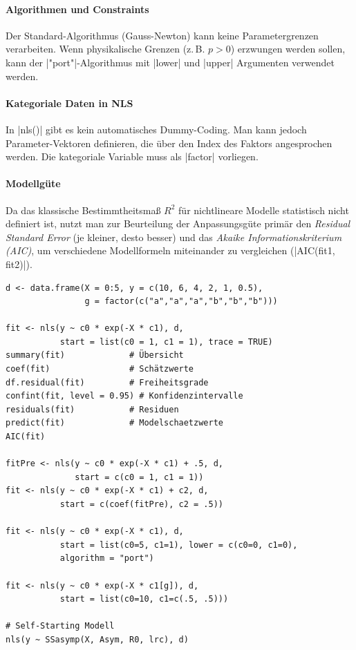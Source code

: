 \documentclass[10pt,twocolumn]{scrartcl}
\renewcommand{\lstinline}{\mycoloredinline}
\begin{document}
\paragraph{Algorithmen und Constraints}
Der Standard-Algorithmus (Gauss-Newton) kann keine Parametergrenzen verarbeiten. Wenn physikalische Grenzen (z.\,B. $p > 0$) erzwungen werden sollen, kann der \lstinline|"port"|-Algorithmus mit \lstinline|lower| und \lstinline|upper| Argumenten verwendet werden.

\paragraph{Kategoriale Daten in NLS}
In \lstinline|nls()| gibt es kein automatisches Dummy-Coding. Man kann jedoch Parameter-Vektoren definieren, die über den Index des Faktors angesprochen werden. Die kategoriale Variable muss als \lstinline|factor| vorliegen.

\paragraph{Modellgüte}
Da das klassische Bestimmtheitsmaß $R^2$ für nichtlineare Modelle statistisch nicht definiert ist, nutzt man zur Beurteilung der Anpassungsgüte primär den \emph{Residual Standard Error} (je kleiner, desto besser) und das \emph{Akaike Informationskriterium (AIC)}, um verschiedene Modellformeln miteinander zu vergleichen (\lstinline|AIC(fit1, fit2)|).

\begin{lstlisting}
d <- data.frame(X = 0:5, y = c(10, 6, 4, 2, 1, 0.5),
                g = factor(c("a","a","a","b","b","b")))

fit <- nls(y ~ c0 * exp(-X * c1), d,
           start = list(c0 = 1, c1 = 1), trace = TRUE)
summary(fit)             # Übersicht
coef(fit)                # Schätzwerte
df.residual(fit)         # Freiheitsgrade
confint(fit, level = 0.95) # Konfidenzintervalle
residuals(fit)           # Residuen
predict(fit)             # Modelschaetzwerte
AIC(fit)

fitPre <- nls(y ~ c0 * exp(-X * c1) + .5, d,
              start = c(c0 = 1, c1 = 1))
fit <- nls(y ~ c0 * exp(-X * c1) + c2, d,
           start = c(coef(fitPre), c2 = .5))

fit <- nls(y ~ c0 * exp(-X * c1), d,
           start = list(c0=5, c1=1), lower = c(c0=0, c1=0), 
           algorithm = "port")

fit <- nls(y ~ c0 * exp(-X * c1[g]), d,
           start = list(c0=10, c1=c(.5, .5)))

# Self-Starting Modell
nls(y ~ SSasymp(X, Asym, R0, lrc), d)
\end{lstlisting}
\end{document}
